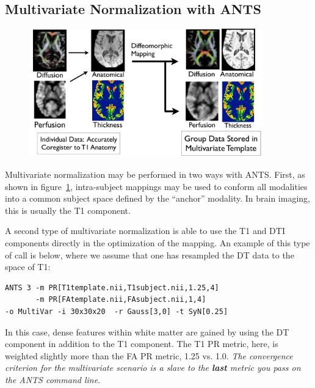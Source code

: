 \documentclass{InsightArticle}
\begin{document}
\subsection{Multivariate Normalization with ANTS}
\begin{figure}
\includegraphics[width=0.9\textwidth]{Figures/multivariatenorm.pdf} 
\vspace{-0.1in}
\label{fig:mvnorm}
\end{figure}
Multivariate normalization may be performed in two ways with ANTS.  
First, as shown in figure~\ref{fig:mvnorm}, intra-subject mappings may 
be used to conform all modalities into a common subject space defined by 
the ``anchor'' modality.  In brain imaging, this is usually the T1 component.  

A second type of multivariate normalization is able to use the T1 and DTI components 
directly in the optimization of the mapping.  An example of this type of call is below, 
where we assume that one has resampled the DT data to the space of T1: 
\begin{verbatim}
ANTS 3 -m PR[T1template.nii,T1subject.nii,1.25,4]
       -m PR[FAtemplate.nii,FAsubject.nii,1,4] 
-o MultiVar -i 30x30x20  -r Gauss[3,0] -t SyN[0.25]
\end{verbatim}
In this case, dense features within white matter are gained by using the DT component  
in addition to the T1 component.   The T1 PR metric, here, is weighted slightly more 
than the FA PR metric, 1.25 vs. 1.0.  {\em The convergence criterion for 
the multivariate scenario is a slave to the {\bf last} metric you 
pass on the ANTS command line}.
\end{document}
